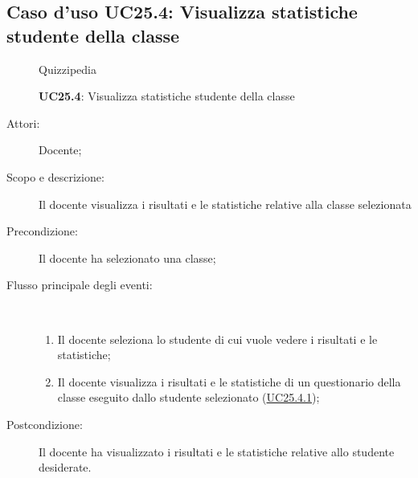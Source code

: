 \subsection{Caso d'uso UC25.4: Visualizza statistiche studente della classe}
	\begin{figure}[H]
		\centering
		\begin{resizedtikzpicture}{\textwidth}
		\begin{umlsystem}[x=0, fill=lightgray!20]{Quizzipedia}
		\end{umlsystem}
		\end{resizedtikzpicture}
		\caption{\textbf{UC25.4}: Visualizza statistiche studente della classe}
		\label{UC25.4}
	\end{figure}
\begin{description}
\item[Attori:] Docente;
\item[Scopo e descrizione:] Il docente visualizza i risultati e le statistiche relative alla classe selezionata
      \item[Precondizione:] Il docente ha selezionato una classe;

        \item[Flusso principale degli eventi:] \ 
 \begin{enumerate}
          \item Il docente seleziona lo studente di cui vuole vedere i risultati e le statistiche;
          \item Il docente visualizza i risultati e le statistiche di un questionario della classe eseguito dallo studente selezionato (\hyperlink{UC25.4.1}{UC25.4.1});

      \end{enumerate}
    \item[Postcondizione:] Il docente ha visualizzato i risultati e le statistiche relative allo studente desiderate.
  \end{description}
\hypertarget{UC25.4.1}{}
